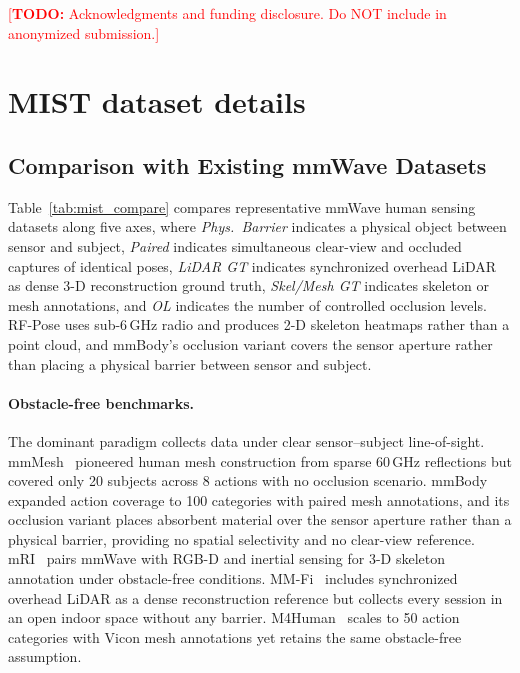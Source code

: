 \documentclass{article}
\newcommand{\todo}[1]{\textcolor{red}{[\textbf{TODO:} #1]}}
\begin{document}
\begin{ack}
\todo{Acknowledgments and funding disclosure. Do NOT include in anonymized submission.}
\end{ack}






\appendix

\section{MIST dataset details}
\label{app:mist}

\subsection{Comparison with Existing mmWave Datasets}
\label{app:mist_compare}

Table~\ref{tab:mist_compare} compares representative mmWave human sensing datasets along
five axes, where \emph{Phys.\ Barrier} indicates a physical object between sensor and subject,
\emph{Paired} indicates simultaneous clear-view and occluded captures of identical poses,
\emph{LiDAR GT} indicates synchronized overhead LiDAR as dense 3-D reconstruction ground truth,
\emph{Skel/Mesh GT} indicates skeleton or mesh annotations, and \emph{OL} indicates the
number of controlled occlusion levels.
RF-Pose uses sub-6\,GHz radio and produces 2-D skeleton heatmaps rather than a point cloud,
and mmBody's occlusion variant covers the sensor aperture rather than placing a physical barrier
between sensor and subject.

\paragraph{Obstacle-free benchmarks.}
The dominant paradigm collects data under clear sensor--subject line-of-sight.
mmMesh~\cite{xue2021mmmesh} pioneered human mesh construction from sparse 60\,GHz
reflections but covered only 20 subjects across 8 actions with no occlusion scenario.
mmBody~\cite{chen2022mmbody} expanded action coverage to 100 categories with paired mesh
annotations, and its occlusion variant places absorbent material over the sensor aperture
rather than a physical barrier, providing no spatial selectivity and no clear-view reference.
mRI~\cite{an2022mri} pairs mmWave with RGB-D and inertial sensing for 3-D skeleton
annotation under obstacle-free conditions.
MM-Fi~\cite{yang2023mm} includes synchronized overhead LiDAR as a dense reconstruction
reference but collects every session in an open indoor space without any barrier.
M4Human~\cite{fan2025m4human} scales to 50 action categories with Vicon mesh annotations
yet retains the same obstacle-free assumption.
\end{document}
